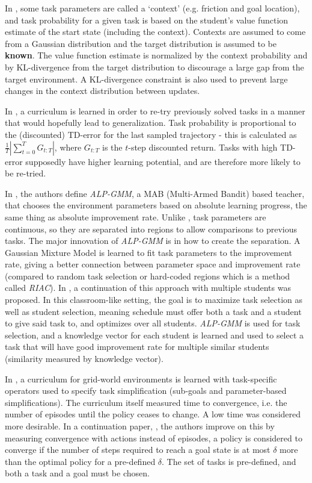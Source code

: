 \documentclass[letterpaper]{article}
\theoremstyle{definition}
\begin{document}
In \cite{Klink2020}, some task parameters are called a `context' (e.g. friction and goal location), and task probability for a given task is based on the student's value function estimate of the start state (including the context).
Contexts are assumed to come from a Gaussian distribution and the target distribution is assumed to be \textbf{known}.
The value function estimate is normalized by the context probability and by KL-divergence from the target distribution to discourage a large gap from the target environment. A KL-divergence constraint is also used to prevent large changes in the context distribution between updates.

In \cite{Jiang2020}, a curriculum is learned in order to re-try previously solved tasks in a manner that would hopefully lead to generalization. Task probability is proportional to the (discounted) TD-error for the last sampled trajectory - this is calculated as $ \frac{1}{T} | \sum_{t=0}^{T} {G_{t:T}}|$, where $G_{t:T}$ is the $t$-step discounted return. Tasks with high TD-error supposedly have higher learning potential, and are therefore more likely to be re-tried. 

In \cite{Portelas2019}, the authors define \textit{ALP-GMM}, a MAB (Multi-Armed Bandit) based teacher, that chooses the environment parameters based on absolute learning progress, the same thing as absolute improvement rate.
Unlike \cite{Matiisen2020}, task parameters are continuous, so they are separated into regions to allow comparisons to previous tasks. The major innovation of \textit{ALP-GMM} is in how to create the separation. A Gaussian Mixture Model is learned to fit task parameters to the improvement rate, giving a better connection between parameter space and improvement rate (compared to random task selection or hard-coded regions which is a method called \textit{RIAC}).
In \cite{Portelas2020}, a continuation of this approach with multiple students was proposed. In this classroom-like setting, the goal is to maximize task selection as well as student selection, meaning schedule must offer both a task and a student to give said task to, and optimizes over all students. \textit{ALP-GMM} is used for task selection, and a knowledge vector for each student is learned and used to select a task that will have good improvement rate for multiple similar students (similarity measured by knowledge vector).

In \cite{Narvekar2019}, a curriculum for grid-world environments is learned with task-specific operators used to specify task simplification (sub-goals and parameter-based simplifications). The curriculum itself measured time to convergence, i.e. the number of episodes until the policy ceases to change. A low time was considered more desirable.
In a continuation paper, \cite{Narvekar2020}, the authors improve on this by measuring convergence with actions instead of episodes, a policy is considered to converge if the number of steps required to reach a goal state is at most $\delta$ more than the optimal policy for a pre-defined $\delta$. The set of tasks is pre-defined, and both a task and a goal must be chosen.
\end{document}
